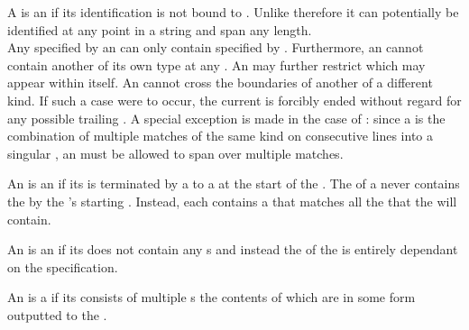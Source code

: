 A  is an  if its identification is not bound to . Unlike  therefore it can potentially be identified at any point in a string and span any length. \\

Any  specified by an  can only contain  specified by . Furthermore, an  cannot contain another  of its own type at any . An  may further restrict which  may appear within itself. An  cannot cross the boundaries of another  of a different kind. If such a case were to occur, the current  is forcibly ended without regard for any possible trailing . A special exception is made in the case of : since a  is the combination of multiple matches of the same kind on consecutive lines into a singular , an  must be allowed to span over multiple matches.

An  is an  if its  is terminated by a  to a  at the start of the . The  of a  never contains the   by the 's starting . Instead, each   contains a  that matches all the  that the  will contain.

An  is an  if its  does not contain any s and instead the  of the  is entirely dependant on the  specification.

An  is a  if its  consists of multiple s the contents of which are in some form outputted to the .












